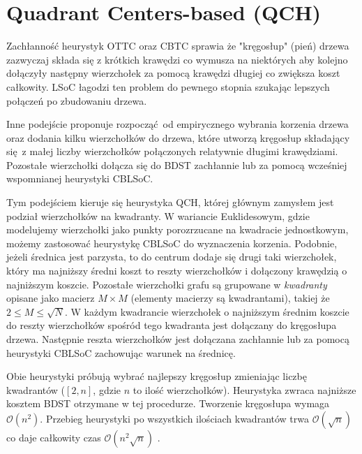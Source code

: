 \section{Quadrant Centers-based (QCH)}
Zachłanność heurystyk OTTC oraz CBTC sprawia że "kręgosłup" (pień) drzewa zazwyczaj składa się z krótkich krawędzi co wymusza na niektórych aby kolejno dołączyły następny wierzchołek za pomocą krawędzi długiej co zwiększa koszt całkowity. LSoC łagodzi ten problem do pewnego stopnia szukając lepszych połączeń po zbudowaniu drzewa.

Inne podejście proponuje rozpocząć od empirycznego wybrania korzenia drzewa oraz dodania kilku wierzchołków do drzewa, które utworzą kręgosłup składający się z małej liczby wierzchołków połączonych relatywnie długimi krawędziami. Pozostałe wierzchołki dołącza się do BDST zachłannie lub za pomocą wcześniej wspomnianej heurystyki CBLSoC.

Tym podejściem kieruje się heurystyka QCH, której głównym zamysłem jest podział wierzchołków na kwadranty. W wariancie Euklidesowym, gdzie modelujemy wierzchołki jako punkty porozrzucane na kwadracie jednostkowym, możemy zastosować heurystykę CBLSoC do wyznaczenia korzenia. Podobnie, jeżeli średnica jest parzysta, to do centrum dodaje się drugi taki wierzchołek, który ma najniższy średni koszt to reszty wierzchołków i dołączony krawędzią o najniższym koszcie. Pozostałe wierzchołki grafu są grupowane w \textit{kwadranty} opisane jako macierz $M\times M$ (elementy macierzy są kwadrantami), takiej że $2 \leq M \leq \sqrt{N}$. W każdym kwadrancie wierzchołek o najniższym średnim koszcie do reszty wierzchołków spośród tego kwadranta jest dołączany do kręgosłupa drzewa. Następnie reszta wierzchołków jest dołączana zachłannie lub za pomocą heurystyki CBLSoC zachowując warunek na średnicę.

Obie heurystyki próbują wybrać najlepszy kręgosłup zmieniając liczbę kwadrantów ($[2,n]$, gdzie $n$ to ilość wierzchołków). Heurystyka zwraca najniższe kosztem BDST otrzymane w tej procedurze. Tworzenie kręgosłupa wymaga $\mathcal{O}(n^2)$. Przebieg heurystyki po wszystkich ilościach kwadrantów trwa $\mathcal{O}(\sqrt{n})$ co daje całkowity czas $\mathcal{O}(n^2 \sqrt{n})$ \cite{DBLP:journals/informaticaSI/PatvardhanPS15}.